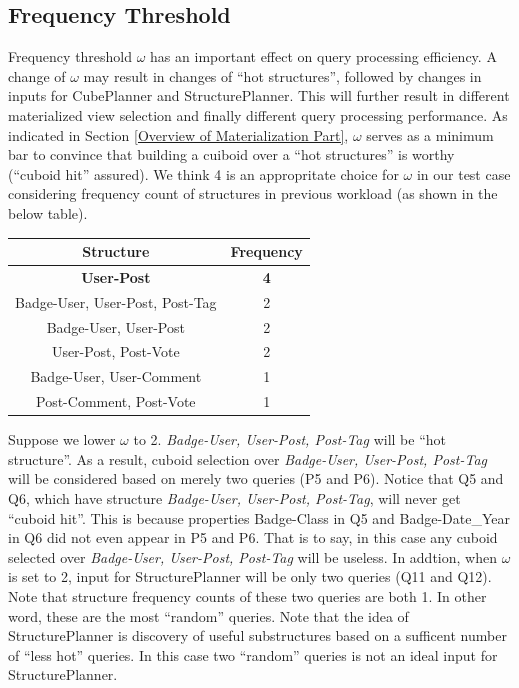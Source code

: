 \subsection{Frequency Threshold}
\label{Frequency Threshold}
Frequency threshold $\omega$ has an important effect on query processing efficiency. A change of $\omega$ may result in changes of ``hot structures'', followed by changes in inputs for CubePlanner and StructurePlanner. This will further result in different materialized view selection and finally different query processing performance. As indicated in Section \ref{Overview of Materialization Part}, $\omega$ serves as a minimum bar to convince that building a cuiboid over a ``hot structures'' is worthy (``cuboid hit'' assured). We think 4 is an appropritate choice for $\omega$ in our test case considering frequency count of structures in previous workload (as shown in the below table). 

\begin{center}
	\begin{tabular}{ | c | c |}  
		\hline
		Structure	&Frequency	\\ \hline 
		\textbf{User-Post} 	&\textbf{4} \\ \hline
		Badge-User, User-Post, Post-Tag 	&2 \\ \hline
		Badge-User, User-Post	&2 \\ \hline
		User-Post, Post-Vote	&2 \\ \hline
		Badge-User, User-Comment	&1 \\ \hline
		Post-Comment, Post-Vote	&1 \\ \hline
	\end{tabular}
	\end {center}

Suppose we lower $\omega$ to 2. \textit{Badge-User, User-Post, Post-Tag} will be ``hot structure''. As a result, cuboid selection over \textit{Badge-User, User-Post, Post-Tag} will be considered based on merely two queries (P5 and P6). Notice that Q5 and Q6, which have structure \textit{Badge-User, User-Post, Post-Tag}, will never get ``cuboid hit''. This is because properties Badge-Class in Q5 and Badge-Date_Year in Q6 did not even appear in P5 and P6. That is to say, in this case any cuboid selected over \textit{Badge-User, User-Post, Post-Tag} will be useless. In addtion, when $\omega$ is set to 2, input for StructurePlanner will be only two queries (Q11 and Q12). Note that structure frequency counts of these two queries are both 1. In other word, these are the most ``random'' queries. Note that the idea of StructurePlanner is discovery of useful substructures based on a sufficent number of ``less hot'' queries. In this case two ``random'' queries is not an ideal input for StructurePlanner.  

